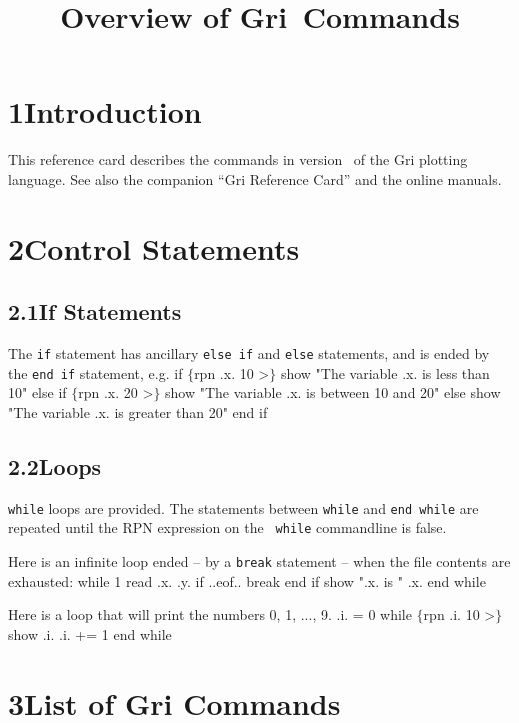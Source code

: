 \def\threecol#1#2#3{\hskip\keyindent\relax#1\hfil&\kbd{#2}\quad
  &\kbd{#3}\quad\cr}


\title{Overview of Gri \griversion$\,$Commands}
\raggedright

\section{1\quad Introduction}
This reference card describes the commands in version \griversion\ of
the Gri plotting language.  See also the companion ``Gri Reference
Card'' and the online manuals.

\section{2\quad Control Statements}

\subsection{2.1\quad If Statements}
The {\tt if} statement has ancillary {\tt else if} and {\tt else}
statements, and is ended by the {\tt end if} statement, e.g.
\beginexample
if $\lbrace$rpn .x. 10 >$\rbrace$
    show "The variable .x. is less than 10"
else if $\lbrace$rpn .x. 20 >$\rbrace$
    show "The variable .x. is between 10 and 20"
else
   show "The variable .x. is greater than 20"
end if
\endexample


\subsection{2.2\quad Loops}
{\tt while} loops are provided.  The statements between {\tt while}
and {\tt end while} are repeated until the RPN expression on the {\tt
while} commandline is false.

Here is an infinite loop ended -- by a {\tt break} statement -- when
the file contents are exhausted:
\beginexample
while 1
    read .x. .y.
    if ..eof..
        break
    end if
    show ".x. is " .x.
end while
\endexample

Here is a loop that will print the numbers 0, 1, ..., 9.
\beginexample
.i. = 0
while $\lbrace$rpn .i. 10 >$\rbrace$
    show .i.
    .i. += 1
end while
\endexample



\section{3\quad List of Gri Commands}

